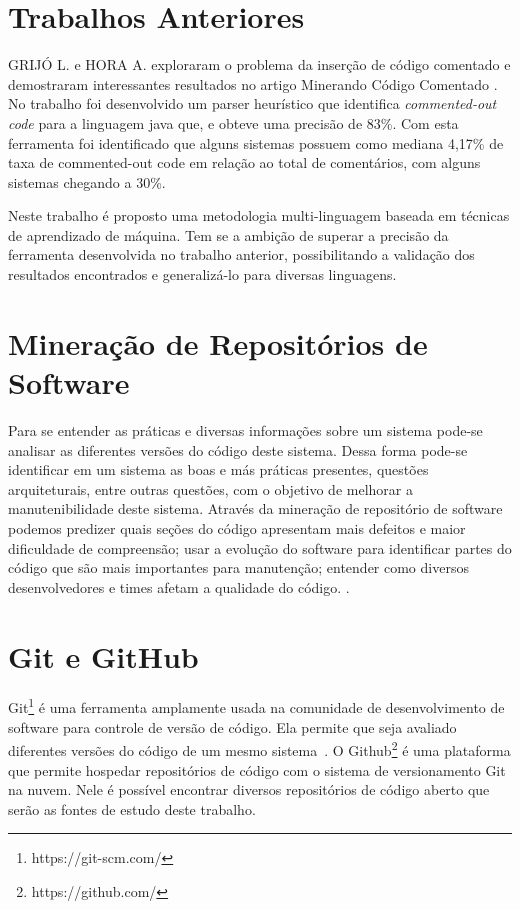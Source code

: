 \documentclass{abnt}
\begin{document}
\section{Trabalhos Anteriores}

GRIJÓ L. e HORA A. exploraram o problema da inserção de código comentado 
e demostraram interessantes resultados no artigo Minerando Código Comentado 
\cite{articleMiningComments}. No trabalho foi desenvolvido um parser heurístico
que identifica \textit{commented-out code} para a linguagem java que, e obteve
uma precisão de 83\%. Com esta ferramenta foi identificado que alguns 
sistemas possuem como mediana 4,17\% de taxa de commented-out code em relação
ao total de comentários, com alguns sistemas chegando a 30\%.

Neste trabalho é proposto uma metodologia multi-linguagem baseada em técnicas de
aprendizado de máquina. Tem se a ambição de superar a precisão da ferramenta
desenvolvida no trabalho anterior, possibilitando a validação dos resultados 
encontrados e generalizá-lo para diversas linguagens.


\section{Mineração de Repositórios de Software}

Para se entender as práticas e diversas informações sobre um sistema pode-se
analisar as diferentes versões do código deste sistema. Dessa forma pode-se 
identificar em um sistema as boas e más práticas presentes, questões arquiteturais,
entre outras questões, com o objetivo de melhorar a manutenibilidade deste sistema.
Através da mineração de repositório de software podemos 
predizer quais seções do código apresentam mais defeitos e maior
dificuldade de compreensão; usar a evolução do software para identificar
partes do código que são mais importantes para manutenção; entender como diversos
desenvolvedores e times afetam a qualidade do código.
\cite{crimeScene}. 


\section{Git e GitHub}

Git\footnote{https://git-scm.com/} é uma ferramenta amplamente usada na 
comunidade de desenvolvimento de software para controle de versão de código.
Ela permite que seja avaliado diferentes versões do código de um mesmo 
sistema~\cite{articleMiningGit}. O Github\footnote{https://github.com/} é 
uma plataforma que permite hospedar repositórios de código com o sistema de versionamento
Git na nuvem. Nele é possível encontrar diversos repositórios de código aberto 
que serão as fontes de estudo deste trabalho. 
\end{document}
